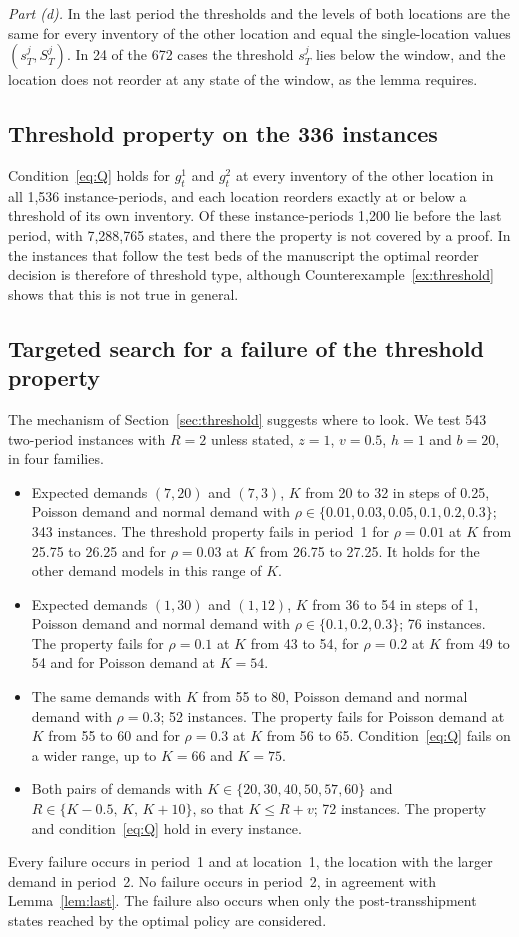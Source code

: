 \documentclass[11pt]{article}
\theoremstyle{definition}
\begin{document}
\emph{Part (d).} In the last period the thresholds and the levels of both locations are the same for every inventory of the other location and equal the single-location values $(s^j_T,S^j_T)$. In 24 of the 672 cases the threshold $s^j_T$ lies below the window, and the location does not reorder at any state of the window, as the lemma requires.

\subsection{Threshold property on the 336 instances}

Condition~\eqref{eq:Q} holds for $g^1_t$ and $g^2_t$ at every inventory of the other location in all 1,536 instance-periods, and each location reorders exactly at or below a threshold of its own inventory. Of these instance-periods 1,200 lie before the last period, with 7,288,765 states, and there the property is not covered by a proof. In the instances that follow the test beds of the manuscript the optimal reorder decision is therefore of threshold type, although Counterexample~\ref{ex:threshold} shows that this is not true in general.

\subsection{Targeted search for a failure of the threshold property}

The mechanism of Section~\ref{sec:threshold} suggests where to look. We test 543 two-period instances with $R=2$ unless stated, $z=1$, $v=0.5$, $h=1$ and $b=20$, in four families.
\begin{itemize}
\item Expected demands $(7,20)$ and $(7,3)$, $K$ from 20 to 32 in steps of 0.25, Poisson demand and normal demand with $\rho\in\{0.01,0.03,0.05,0.1,0.2,0.3\}$; 343 instances. The threshold property fails in period~1 for $\rho=0.01$ at $K$ from 25.75 to 26.25 and for $\rho=0.03$ at $K$ from 26.75 to 27.25. It holds for the other demand models in this range of $K$.
\item Expected demands $(1,30)$ and $(1,12)$, $K$ from 36 to 54 in steps of 1, Poisson demand and normal demand with $\rho\in\{0.1,0.2,0.3\}$; 76 instances. The property fails for $\rho=0.1$ at $K$ from 43 to 54, for $\rho=0.2$ at $K$ from 49 to 54 and for Poisson demand at $K=54$.
\item The same demands with $K$ from 55 to 80, Poisson demand and normal demand with $\rho=0.3$; 52 instances. The property fails for Poisson demand at $K$ from 55 to 60 and for $\rho=0.3$ at $K$ from 56 to 65. Condition~\eqref{eq:Q} fails on a wider range, up to $K=66$ and $K=75$.
\item Both pairs of demands with $K\in\{20,30,40,50,57,60\}$ and $R\in\{K-0.5,\,K,\,K+10\}$, so that $K\le R+v$; 72 instances. The property and condition~\eqref{eq:Q} hold in every instance.
\end{itemize}
Every failure occurs in period~1 and at location~1, the location with the larger demand in period~2. No failure occurs in period~2, in agreement with Lemma~\ref{lem:last}. The failure also occurs when only the post-transshipment states reached by the optimal policy are considered.
\end{document}

